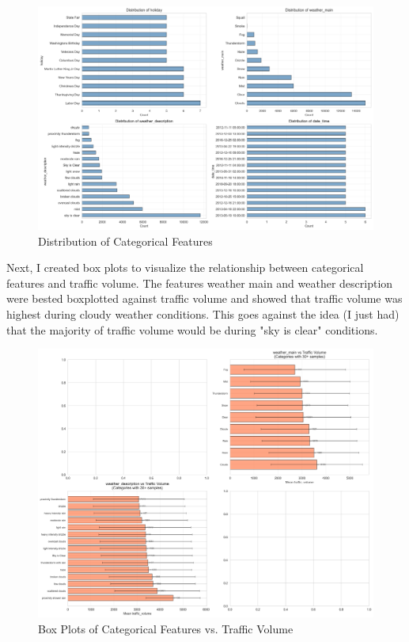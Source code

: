 \documentclass[12pt]{article}
\begin{document}
\begin{figure}[H]
    \centering
    \includegraphics[width=1\textwidth]{images/eda_categorical_distributions.png}
    \caption{Distribution of Categorical Features}
    \label{fig:eda_categorical_distributions}
\end{figure}

Next, I created box plots to visualize the relationship between categorical features and traffic volume. The features weather main and weather description were bested boxplotted against
traffic volume and showed that traffic volume was highest during cloudy weather conditions. This goes against the idea (I just had) that the majority of traffic volume would be during "sky is clear" conditions.

\begin{figure}[H]
    \centering
    \includegraphics[width=1\textwidth]{images/eda_categorical_vs_target.png}
    \caption{Box Plots of Categorical Features vs. Traffic Volume}
    \label{fig:eda_categorical_boxplots}
\end{figure}
\end{document}
